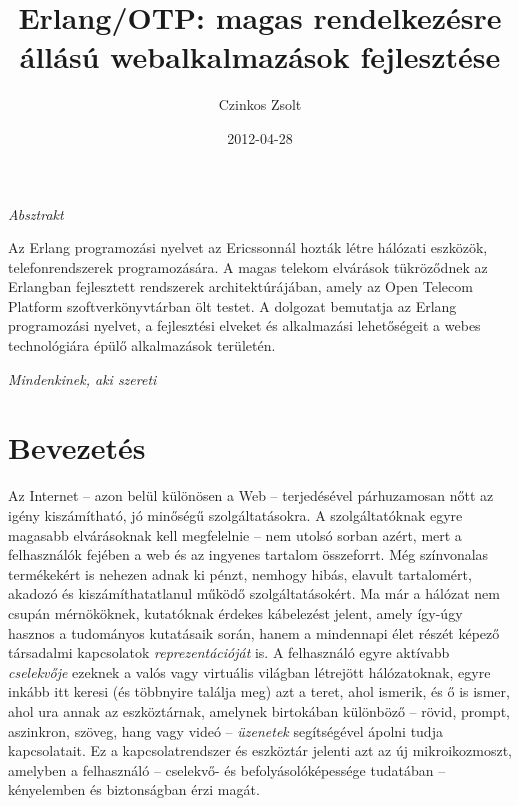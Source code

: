 \documentclass[12pt, a4paper, oneside]{book}
\author{Czinkos Zsolt}
\title{Erlang/OTP: magas rendelkezésre állású webalkalmazások fejlesztése}
\date{2012-04-28}
\newenvironment{abstract}
{\newpage \pagestyle{empty} \vspace*{\fill} \begin{center}\em{Absztrakt}\end{center}}
{\vspace*{\fill} \newpage}
\begin{document}
\maketitle

\onehalfspacing

\begin{abstract}
Az Erlang programozási nyelvet az Ericssonnál hozták létre hálózati
eszközök, telefonrendszerek programozására. A magas telekom elvárások
tükröződnek az Erlangban fejlesztett rendszerek architektúrájában,
amely az Open Telecom Platform szoftverkönyvtárban ölt testet. A dolgozat
bemutatja az Erlang programozási nyelvet, a fejlesztési elveket és
alkalmazási lehetőségeit a webes technológiára épülő alkalmazások területén.
\end{abstract}

\newpage
\pagestyle{empty}
\vspace*{\fill} 
\hfill \emph{Mindenkinek, aki szereti}
\vspace*{\fill} 
\newpage

\pagestyle{fancy}

\tableofcontents

\chapter{Bevezetés}

Az Internet -- azon belül különösen a Web -- terjedésével párhuzamosan nőtt az
igény kiszámítható, jó minőségű szolgáltatásokra. A szolgáltatóknak egyre
magasabb elvárásoknak kell megfelelnie -- nem utolsó sorban azért, mert a
felhasználók fejében a web és az ingyenes tartalom összeforrt. Még színvonalas
termékekért is nehezen adnak ki pénzt, nemhogy hibás, elavult tartalomért,
akadozó és kiszámíthatatlanul működő szolgáltatásokért. Ma már a hálózat nem
csupán mérnököknek, kutatóknak érdekes kábelezést jelent, amely így-úgy hasznos
a tudományos kutatásaik során, hanem a mindennapi élet részét képező társadalmi
kapcsolatok \textit{reprezentációját} is. A felhasználó egyre aktívabb
\textit{cselekvője} ezeknek a valós vagy virtuális világban létrejött
hálózatoknak, egyre inkább itt keresi (és többnyire találja meg) azt a teret,
ahol ismerik, és ő is ismer, ahol ura annak az eszköztárnak, amelynek
birtokában különböző -- rövid, prompt, aszinkron, szöveg, hang vagy videó --
\textit{üzenetek} segítségével ápolni tudja kapcsolatait. Ez a
kapcsolatrendszer és eszköztár jelenti azt az új mikroikozmoszt, amelyben a
felhasználó -- cselekvő- és befolyásolóképessége tudatában -- kényelemben és
biztonságban érzi magát.
\end{document}
